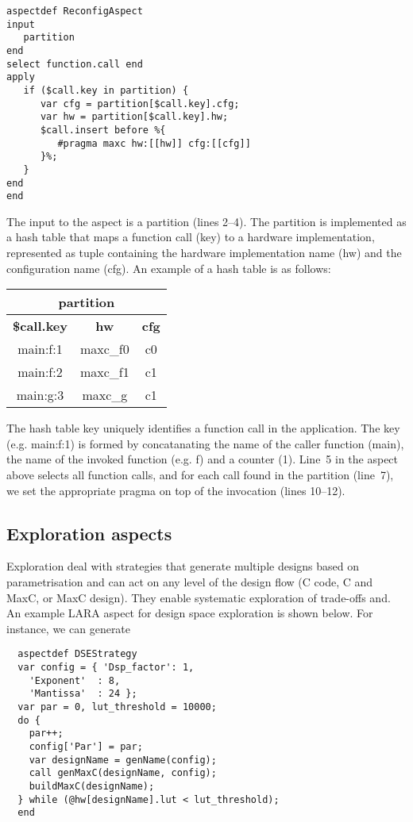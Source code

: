\lstset{style=lara}
\begin{lstlisting}
aspectdef ReconfigAspect
input 
   partition 
end
select function.call end 
apply
   if ($call.key in partition) {
      var cfg = partition[$call.key].cfg;
      var hw = partition[$call.key].hw;      
      $call.insert before %{ 
         #pragma maxc hw:[[hw]] cfg:[[cfg]] 
      }%;
   }
end
end
\end{lstlisting}

\noindent The input to the aspect is a partition (lines 2--4). The partition is implemented as 
a hash table that maps a function call (key) to a hardware implementation, represented as tuple containing the hardware implementation name (hw) and the configuration name (cfg). An example of a hash table is as follows:

{\footnotesize
{}\selectfont
\begin{tabular}{c|c|c}
\hline
\multicolumn{3}{c}{\bf{partition}} \\
\hline
\bf{\$call.key} & \bf{hw} & \bf{cfg}  \\
\hline
main:f:1 & maxc\_f0 & c0 \\
main:f:2 & maxc\_f1 & c1 \\
main:g:3 & maxc\_g & c1 \\
\hline
\end{tabular}
}




The hash table key uniquely identifies a function call in the application. The key (e.g. main:f:1) is formed by concatanating the name of the caller function (main), the name of the invoked function (e.g. f) and a counter (1).  Line~5 in the aspect above selects all function calls, and for each call found in the partition (line~7), we set the appropriate pragma on top of the invocation (lines 10--12). 



\subsection{Exploration aspects}

Exploration deal with strategies that generate multiple designs based
on parametrisation and can act on any level of the design flow (C
code, C and MaxC, or MaxC design). They enable systematic exploration
of trade-offs and. An example LARA aspect for design space exploration
is shown below. For instance, we can generate

\lstset{style=lara}
\begin{lstlisting}
  aspectdef DSEStrategy
  var config = { 'Dsp_factor': 1,
    'Exponent'  : 8,
    'Mantissa'  : 24 };
  var par = 0, lut_threshold = 10000;
  do {
    par++;
    config['Par'] = par;
    var designName = genName(config);
    call genMaxC(designName, config);
    buildMaxC(designName);
  } while (@hw[designName].lut < lut_threshold);
  end
\end{lstlisting}

